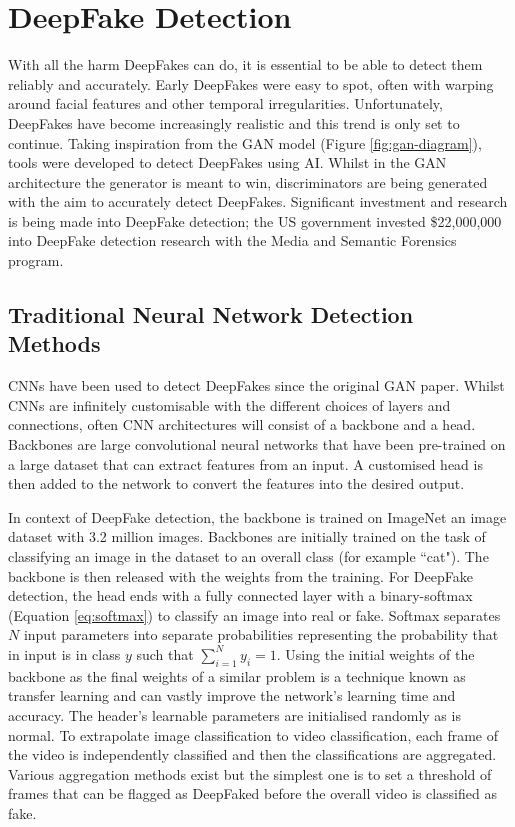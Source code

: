 \section{DeepFake Detection}

With all the harm DeepFakes can do, it is essential to be able to detect them reliably and accurately. Early DeepFakes were easy to spot, often with warping around facial features and other temporal irregularities\cite{diel2024human}. Unfortunately, DeepFakes have become increasingly realistic and this trend is only set to continue. Taking inspiration from the GAN model (Figure \ref{fig:gan-diagram}), tools were developed to detect DeepFakes using AI. Whilst in the GAN architecture the generator is meant to win, discriminators are being generated with the aim to accurately detect DeepFakes. Significant investment and research is being made into DeepFake detection; the US government invested \$22,000,000 into DeepFake detection research with the Media and Semantic Forensics program\cite{harris2023deep}.

\subsection{Traditional Neural Network Detection Methods}

CNNs have been used to detect DeepFakes since the original GAN paper\cite{goodfellow2014generative}. Whilst CNNs are infinitely customisable with the different choices of layers and connections, often CNN architectures will consist of a backbone and a head\cite{elharrouss2024backbones}. Backbones are large convolutional neural networks that have been pre-trained on a large dataset that can extract features from an input. A customised head is then added to the network to convert the features into the desired output.

In context of DeepFake detection, the backbone is trained on ImageNet\cite{deng2009imagenet} an image dataset with 3.2 million images. Backbones are initially trained on the task of classifying an image in the dataset to an overall class (for example ``cat"). The backbone is then released with the weights from the training. For DeepFake detection, the head ends with a fully connected layer with a binary-softmax (Equation \ref{eq:softmax}) to classify an image into real or fake. Softmax separates $N$ input parameters into separate probabilities representing the probability that in input is in class $y$ such that $\sum^N_{i=1} y_i=1$. Using the initial weights of the backbone as the final weights of a similar problem is a technique known as transfer learning\cite{bozinovski1976influence} and can vastly improve the network's learning time and accuracy. The header's learnable parameters are initialised randomly as is normal. To extrapolate image classification to video classification, each frame of the video is independently classified and then the classifications are aggregated. Various aggregation methods exist but the simplest one is to set a threshold of frames that can be flagged as DeepFaked before the overall video is classified as fake.

